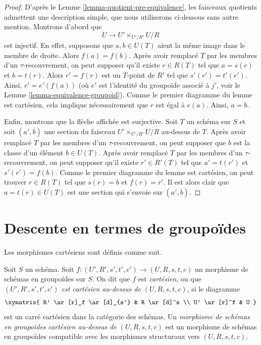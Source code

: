\begin{proof}
D'après le Lemme \ref{lemma-quotient-pre-equivalence}, les faisceaux quotients
admettent une description simple, que nous utiliserons ci-dessous sans autre mention.
Montrons d'abord que
$$
U \longrightarrow U' \times_{U'/R'} U/R
$$
est injectif. En effet, supposons que $a, b \in U(T)$ aient la même image
dans le membre de droite. Alors $f(a) = f(b)$. Après avoir remplacé $T$ par les
membres d'un $\tau$-recouvrement, on peut supposer qu'il existe
$r \in R(T)$ tel que $a = s(r)$ et $b = t(r)$. Alors $r' = f(r)$
est un $T$-point de $R'$ tel que $s'(r') = t'(r')$. Ainsi,
$r' = e'(f(a))$ (où $e'$ est l'identité du groupoïde
associé à $j'$, voir le Lemme \ref{lemma-equivalence-groupoid}).
Comme le premier diagramme du lemme est cartésien, cela implique
nécessairement que $r$ est égal à $e(a)$. Ainsi, $a = b$.

\medskip\noindent
Enfin, montrons que la flèche affichée est surjective. Soit
$T$ un schéma sur $S$ et soit $(a', \overline{b})$ une section
du faisceau $U' \times_{U'/R'} U/R$ au-dessus de $T$. Après avoir remplacé $T$
par les membres d'un $\tau$-recouvrement, on peut supposer que $\overline{b}$
est la classe d'un élément $b \in U(T)$. Après avoir remplacé $T$
par les membres d'un $\tau$-recouvrement, on peut supposer qu'il existe
$r' \in R'(T)$ tel que $a' = t(r')$ et $s'(r') = f(b)$.
Comme le premier diagramme du lemme est cartésien, on peut trouver
$r \in R(T)$ tel que $s(r) = b$ et $f(r) = r'$. Il est alors clair
que $a = t(r) \in U(T)$ est une section qui s'envoie sur
$(a', \overline{b})$.
\end{proof}








\section{Descente en termes de groupoïdes}
\label{section-groupoids-descent}

\noindent
Les morphismes cartésiens sont définis comme suit.

\begin{definition}
\label{definition-cartesian-morphism}
Soit $S$ un schéma. Soit $f : (U', R', s', t', c') \to (U, R, s, t, c)$
un morphisme de schémas en groupoïdes sur $S$. On dit que $f$ est {\it cartésien}, ou
que {\it $(U', R', s', t', c')$ est cartésien au-dessus de $(U, R, s, t, c)$},
si le diagramme
$$
\xymatrix{
R' \ar[r]_f \ar[d]_{s'} & R \ar[d]^s \\
U' \ar[r]^f & U
}
$$
est un carré cartésien dans la catégorie des schémas. Un {\it morphisme de schémas en groupoïdes
cartésien au-dessus de $(U, R, s, t, c)$} est un morphisme de schémas en groupoïdes
compatible avec les morphismes structuraux vers $(U, R, s, t, c)$.
\end{definition}

